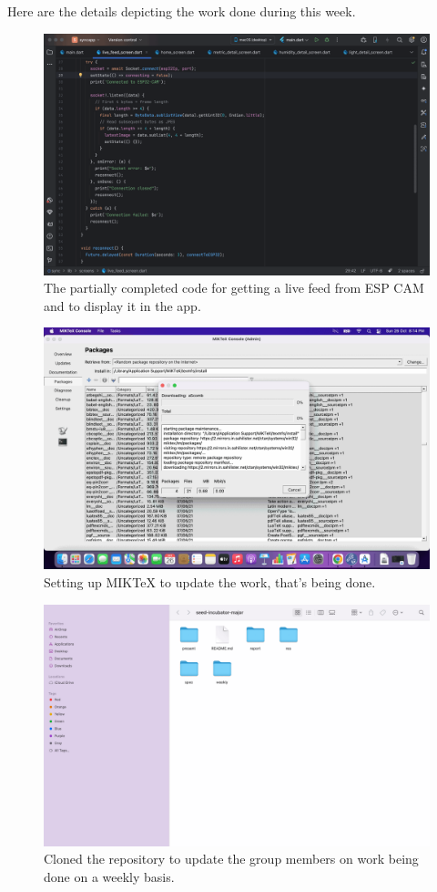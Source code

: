 \documentclass[../weekly]{subfiles}
\begin{document}

Here are the details depicting the work done during this week.

\begin{figure}
    \centering
    \includegraphics[height=0.2\textheight,keepaspectratio]{ss1.png}
    \caption{The partially completed code for getting a live feed from ESP CAM and to display it in the app.}
    \label{fig:laptop1}
\end{figure}

\begin{figure}
    \centering
    \includegraphics[height=0.2\textheight,keepaspectratio]{ss2.png}
    \caption{Setting up MIKTeX to update the work, that's being done. }
    \label{fig:laptop2}
\end{figure}

\begin{figure}
    \centering
    \includegraphics[height=0.2\textheight,keepaspectratio]{ss3.png}
    \caption{Cloned the repository to update the group members on work being done on a weekly basis. }
    \label{fig:laptop3}
\end{figure}
\end{document}
